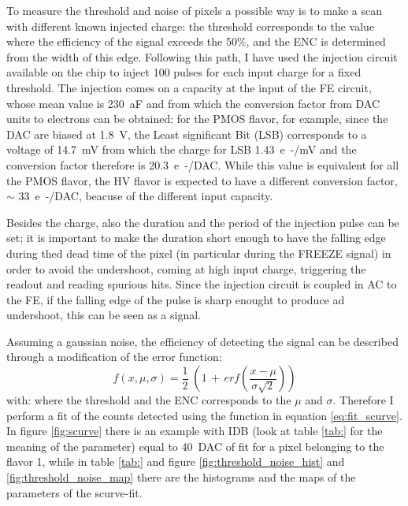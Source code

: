         To measure the threshold and noise of pixels a possible way is to make a scan with different known injected charge: the threshold corresponds to the value where the efficiency of the signal exceeds the 50\%, and the ENC is determined from the width of this edge.        
        Following this path, I have used the injection circuit available on the chip to inject 100 pulses for each input charge for a fixed threshold.
        The injection comes on a capacity at the input of the FE circuit, whose mean value is \SI{230}{aF} and from which the conversion factor from DAC units to electrons can be obtained: for the PMOS flavor, for example, since the DAC are biased at \SI{1.8}{V}, the Least significant Bit (LSB) corresponds to a voltage of \SI{14.7}{mV} from which the charge for LSB \SI{1.43}{e-/mV} and the conversion factor therefore is \SI{20.3}{e-/DAC}.     
        While this value is equivalent for all the PMOS flavor, the HV flavor is expected to have a different conversion factor, $\sim$ \SI{33}{e-/DAC}, beacuse of the different input capacity. 

        Besides the charge, also the duration and the period of the injection pulse can be set; it is important to make the duration short enough to have the falling edge during thed dead time of the pixel (in particular during the FREEZE signal) in order to avoid the undershoot, coming at high input charge, triggering the readout and reading spurious hits. 
        Since the injection circuit is coupled in AC to the FE, if the falling edge of the pulse is sharp enought to produce ad undershoot, this can be seen as a signal. 

        Assuming a gaussian noise, the efficiency of detecting the signal can be described through a modification of the error function:
        \begin{equation}
            f(x, \mu, \sigma) = \frac{1}{2} \; \left(1\,+\,erf\left(\frac{x-\mu}{\sigma \sqrt{2}}\right)\right)
            \label{eq:fit_scurve}
        \end{equation}
        with: 
        where the threshold and the ENC corresponds to the $\mu$ and $\sigma$.
        Therefore I perform a fit of the counts detected using the function in equation \ref{eq:fit_scurve}. In figure \ref{fig:scurve} there is an example with IDB (look at table \ref{tab:} for the meaning of the parameter) equal to \SI{40}{DAC} of fit for a pixel belonging to the flavor 1, while in table \ref{tab:} and figure \ref{fig:threshold_noise_hist} and \ref{fig:threshold_noise_map} there are the histograms and the maps of the parameters of the scurve-fit. 

